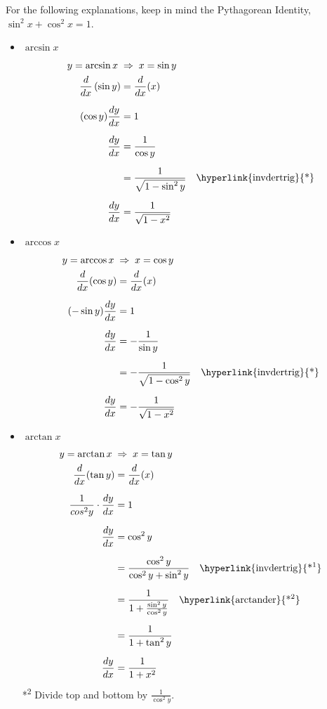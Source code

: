 \documentclass[12pt]{article}
\begin{document}
            For the following explanations, keep in mind the \hypertarget{invdertrig}{Pythagorean Identity}, $\sin^2{x} + \cos^2{x} = 1$.
            \begin{itemize}
                \item $\arcsin{x}$
                \begin{align*}
                    y = \arcsin{x} \; &\Rightarrow \; x = \sin{y} \\
                    \frac{d}{dx} \left( \sin{y} \right) &= \frac{d}{dx}(x) \\[6pt]
                    (\cos{y}) \frac{dy}{dx} &= 1 \\[6pt]
                    \frac{dy}{dx} &= \frac{1}{\cos{y}} \\[6pt]
                    &= \frac{1}{\sqrt{1 - \sin^2{y}}} \quad \text{\hyperlink{invdertrig}{*}}\\[6pt]
                    \frac{dy}{dx} &= \frac{1}{\sqrt{1 - x^2}}
                \end{align*}

                \item $\arccos{x}$
                \begin{align*}
                    y = \arccos{x} \; &\Rightarrow \; x = \cos{y} \\
                    \frac{d}{dx} (\cos{y}) &= \frac{d}{dx} (x) \\[6pt]
                    (-\sin{y}) \frac{dy}{dx} &= 1 \\[6pt]
                    \frac{dy}{dx} &= -\frac{1}{\sin{y}} \\[6pt]
                    &= -\frac{1}{\sqrt{1 - \cos^2{y}}} \quad \text{\hyperlink{invdertrig}{*}} \\[6pt]
                    \frac{dy}{dx} &= -\frac{1}{\sqrt{1 - x^2}}
                \end{align*}

                \item $\arctan{x}$
                \begin{align*}
                    y = \arctan{x} \; &\Rightarrow \; x = \tan{y} \\
                    \frac{d}{dx} (\tan{y}) &= \frac{d}{dx} (x) \\[6pt]
                    \frac{1}{cos^2{y}} \cdot \frac{dy}{dx} &= 1 \\[6pt]
                    \frac{dy}{dx} &= \cos^2{y} \\[6pt]
                    &= \frac{\cos^2{y}}{\cos^2{y} + \sin^2{y}} \quad \text{\hyperlink{invdertrig}{*\textsuperscript{1}}} \\[6pt]
                    &= \frac{1}{1 + \frac{\sin^2{y}}{\cos^2{y}}} \quad \text{\hyperlink{arctander}{*\textsuperscript{2}}}\\[6pt]
                    &= \frac{1}{1 + \tan^2{y}} \\[6pt]
                    \frac{dy}{dx} &= \frac{1}{1 + x^2}
                \end{align*}
                \hypertarget{arctander}{*\textsuperscript{2} Divide top and bottom by $\frac{1}{\cos^2{y}}$.}
            \end{itemize}
\end{document}
